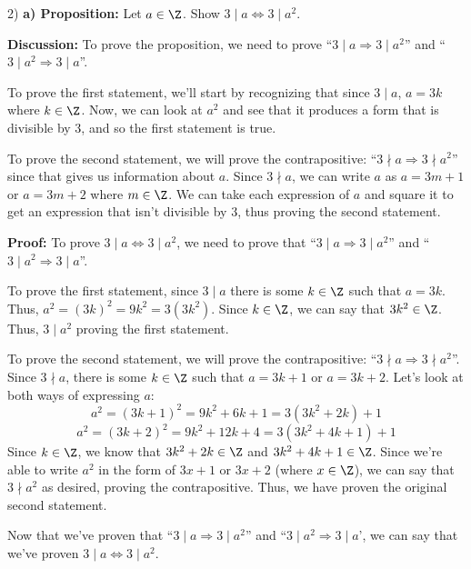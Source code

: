     \begin{paragraph}{2)}
        \textbf{a) Proposition:} Let $a \in \Z$. Show $3 \mid a \iff 3 \mid a^2$.
        \spacing

        \textbf{Discussion:} To prove the proposition, we need to prove 
        ``$3 \mid a \Rightarrow 3 \mid a^2$'' and ``$3 \mid a^2 \Rightarrow 3 \mid a$''.
        \spacing

        To prove the first statement, we'll start by recognizing that since $3 \mid a$,
        $a = 3k$ where $k \in \Z$. Now, we can look at $a^2$ and see that it produces 
        a form that is divisible by 3, and so the first statement is true.
        \spacing
        
        To prove the second statement, we will prove the contrapositive: ``$3 \nmid a \Rightarrow 3 \nmid a^2$''
        since that gives us information about $a$. Since $3 \nmid a$, we can write $a$ as 
        $a = 3m + 1$ or $a = 3m + 2$ where $m \in \Z$. We can take each expression of $a$
        and square it to get an expression that isn't divisible by 3, thus proving the second
        statement.
        \spacing

        \textbf{Proof:} To prove $3 \mid a \iff 3 \mid a^2$, we need to prove that 
        ``$3 \mid a \Rightarrow 3 \mid a^2$'' and ``$3 \mid a^2 \Rightarrow 3 \mid a$''.
        \spacing

        To prove the first statement, since $3 \mid a$ there is some $k \in \Z$ such that 
        $a = 3k$. Thus, $a^2 = (3k)^2 = 9k^2 = 3(3k^2)$. Since $k \in \Z$, we can say that 
        $3k^2 \in \Z$. Thus, $3 \mid a^2$ proving the first statement.
        \spacing

        To prove the second statement, we will prove the contrapositive: ``$3 \nmid a \Rightarrow 3 \nmid a^2$''.
        Since $3 \nmid a$, there is some $k \in \Z$ such that $a = 3k + 1$ or $a = 3k+2$.
        Let's look at both ways of expressing $a$:
        $$a^2 = (3k + 1)^2 = 9k^2 + 6k + 1 = 3(3k^2 + 2k) + 1$$
        $$a^2 = (3k + 2)^2 = 9k^2 + 12k + 4 = 3(3k^2 + 4k + 1) + 1$$
        Since $k \in \Z$, we know that $3k^2 + 2k \in \Z$ and $3k^2 +4k + 1 \in \Z$.
        Since we're able to write $a^2$ in the form of $3x + 1$ or $3x + 2$ (where $x \in \Z$),
        we can say that $3 \nmid a^2$ as desired, proving the contrapositive. Thus, we have proven the 
        original second statement.
        \spacing

        Now that we've proven that ``$3 \mid a \Rightarrow 3 \mid a^2$'' and ``$3 \mid a^2 \Rightarrow 3 \mid a$',
        we can say that we've proven $3 \mid a \iff 3 \mid a^2$.
        \proofEnd\bigskip


\end{paragraph}
